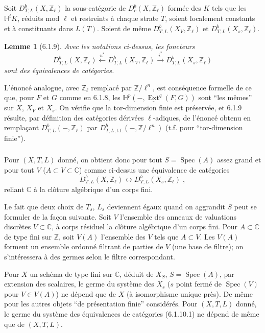 \documentclass[12pt,a4paper]{article}
\theoremstyle{plain}
\newtheorem{lemma}[theorem]{Lemme}
\theoremstyle{definition}
\theoremstyle{remark}
\DeclareMathOperator{\Ext}{Ext}
\DeclareMathOperator{\Spec}{Spec}
\newcommand{\CC}{\mathbb{C}}
\newcommand{\HH}{\mathbb{H}}
\newcommand{\ZZ}{\mathbb{Z}}
\begin{document}
Soit $D^b_{T, L}(X, \ZZ_{\ell})$ la sous-cat\'egorie de $D^b_c(X, \ZZ_{\ell})$ form\'ee des $K$ tels que les $\HH^iK$, r\'eduits mod $\ell$ et restreints \`a chaque strate $T$, soient localement constants et \`a constituants dans $L(T)$. Soient de m\^eme $D^b_{T, L}(X_V, \ZZ_{\ell})$ et $D^b_{T, L}(X_s, \ZZ_{\ell})$.

\begin{lemma}[6.1.9]
Avec les notations ci-dessus, les foncteurs
\[
D^b_{T, L}(X, \ZZ_{\ell}) \xleftarrow{u^*} D^b_{T, L}(X_V, \ZZ_{\ell}) \xrightarrow{i^*} D^b_{T, L}(X_s, \ZZ_{\ell})
\]
sont des \'equivalences de cat\'egories.
\end{lemma}

L'\'enonc\'e analogue, avec $\ZZ_{\ell}$ remplac\'e par $\ZZ/\ell^n$, est cons\'equence formelle de ce que, pour $F$ et $G$ comme en 6.1.8, les $\HH^p(-, \underline{\Ext}^q(F, G))$ sont ``les m\^emes'' sur $X$, $X_V$ et $X_s$. On v\'erifie que la tor-dimension finie est pr\'eserv\'ee, et 6.1.9 r\'esulte, par d\'efinition des cat\'egories d\'eriv\'ees $\ell$-adiques, de l'\'enonc\'e obtenu en rempla\c{c}ant $D^b_{T, L}(-, \ZZ_{\ell})$ par $D^b_{T, L, \text{t.f.}}(-, \ZZ/\ell^n)$ (t.f. pour ``tor-dimension finie'').

\subsubsection{}
Pour $(X, T, L)$ donn\'e, on obtient donc pour tout $S = \Spec(A)$ assez grand et pour tout $V$ ($A \subset V \subset \CC$) comme ci-dessus une \'equivalence de cat\'egories
\begin{equation}\label{eq:6.1.10.1}
D^b_{T, L}(X, \ZZ_{\ell}) \longleftrightarrow D^b_{T, L}(X_s, \ZZ_{\ell})\;,
\end{equation}
reliant $\CC$ \`a la cl\^oture alg\'ebrique d'un corps fini.

Le fait que deux choix de $T_s$, $L_s$ deviennent \'egaux quand on aggrandit $S$ peut se formuler de la fa\c{c}on suivante. Soit $V$ l'ensemble des anneaux de valuations discr\`etes $V \subset \CC$, \`a corps r\'esiduel la cl\^oture alg\'ebrique d'un corps fini. Pour $A \subset \CC$ de type fini sur $\ZZ$, soit $V(A)$ l'ensemble des $V$ tels que $A \subset V$. Les $V(A)$ forment un ensemble ordonn\'e filtrant de parties de $V$ (une base de filtre); on s'int\'eressera \`a des germes selon le filtre correspondant.

Pour $X$ un sch\'ema de type fini sur $\CC$, d\'eduit de $X_S$, $S = \Spec(A)$, par extension des scalaires, le germe du syst\`eme des $X_s$ ($s$ point ferm\'e de $\Spec(V)$ pour $V \in V(A)$) ne d\'epend que de $X$ (\`a isomorphisme unique pr\`es). De m\^eme pour les autres objets ``de pr\'esentation finie'' consid\'er\'es. Pour $(X, T, L)$ donn\'e, le germe du syst\`eme des \'equivalences de cat\'egories (6.1.10.1) ne d\'epend de m\^eme que de $(X, T, L)$.
\end{document}
